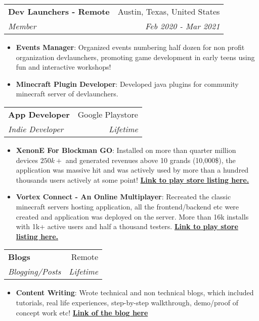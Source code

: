 \documentclass[letterpaper,11pt]{article}
\makeatletter
\newcommand{\resumeItem}[2]{
  \item\small{
    \textbf{#1}{: #2 \vspace{-2pt}}
  }
}
\newcommand{\resumeSubheading}[4]{
  \vspace{-1pt}\item
    \begin{tabular*}{0.97\textwidth}[t]{l@{\extracolsep{\fill}}r}
      \textbf{#1} & #2 \\
      \textit{\small#3} & \textit{\small #4} \\
    \end{tabular*}\vspace{-5pt}
}
\newcommand{\resumeSubSubheading}[2]{
    \begin{tabular*}{0.97\textwidth}{l@{\extracolsep{\fill}}r}
      \textit{\small#1} & \textit{\small #2} \\
    \end{tabular*}\vspace{-5pt}
}
\newcommand{\resumeSubHeadingListEnd}{\end{itemize}}
\newcommand{\resumeItemListStart}{\begin{itemize}}
\newcommand{\resumeItemListEnd}{\end{itemize}\vspace{-5pt}}
\makeatother
\begin{document}

    \resumeSubheading
      {Dev Launchers - Remote}{Austin, Texas, United States}
      {Member}{Feb 2020 - Mar 2021}
      \resumeItemListStart
        \resumeItem{Events Manager}
          {Organized events numbering half dozen for non profit organization devlaunchers, promoting game development in early teens using fun and interactive workshops!}
        \resumeItem{Minecraft Plugin Developer}
          {Developed java plugins for community minecraft server of devlaunchers.}
      \resumeItemListEnd

      

    \resumeSubheading
      {App Developer}{Google Playstore}
      {Indie Developer}{Lifetime}
      \resumeItemListStart
        \resumeItem{XenonE For Blockman GO}
          {Installed on more than quarter million devices \(250k+\) and generated revenues above 10 grands (10,000\$), the application was massive hit and was actively used by more than a hundred thousands users actively at some point!
          \textbf{\href{https://play.google.com/store/apps/details?id=cf.androefi.xenone}{Link to play store listing here.}}}
        \resumeItem{Vortex Connect - An Online Multiplayer}
          {Recreated the classic minecraft servers hosting application, all the frontend/backend etc were created and application was deployed on the server. More than 16k installs with 1k+ active users and half a thousand testers.
          \textbf{\href{https://play.google.com/store/apps/details?id=com.skullzbones.vortexconnect}{Link to play store listing here.}}}
      \resumeItemListEnd

    \resumeSubheading
      {Blogs}{Remote}
      {Blogging/Posts}{Lifetime}
      \resumeItemListStart
        \resumeItem{Content Writing}
          {Wrote technical and non technical blogs, which included tutorials, real life experiences, step-by-step walkthrough, demo/proof of concept work etc! \textbf{\href{https://withme.skullzbones.com/blog}{Link of the blog here}}}
      \resumeItemListEnd
\end{document}
